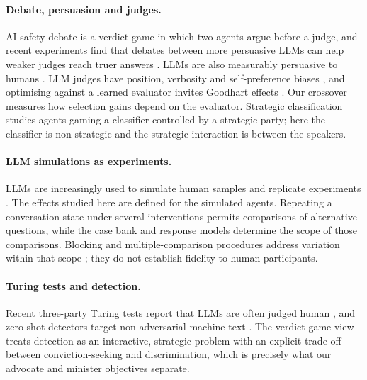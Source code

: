 \documentclass[10pt,a4paper]{article}
\theoremstyle{remark}
\begin{document}
\paragraph{Debate, persuasion and judges.}
AI-safety debate \citep{irving2018} is a verdict game in which two agents argue before a judge, and recent experiments
find that debates between more persuasive LLMs can help weaker judges reach truer answers \citep{khan2024}. LLMs are
also measurably persuasive to humans \citep{salvi2024}. LLM judges have position, verbosity and self-preference biases
\citep{zheng2023,wang2024fair,panickssery2024}, and optimising against a learned evaluator invites Goodhart effects
\citep{manheim2018,gao2023}. Our crossover measures how selection gains depend on the evaluator. Strategic classification
\citep{hardt2015,ghalme2021} studies agents gaming a classifier controlled by a strategic party; here the classifier is
non-strategic and the strategic interaction is between the speakers.

\paragraph{LLM simulations as experiments.}
LLMs are increasingly used to simulate human samples and replicate experiments
\citep{argyle2023,aher2023,horton2023,park2023,ziems2024}. The effects studied here are defined for the simulated agents. Repeating a conversation state under several
interventions permits comparisons of alternative questions, while the case bank and response models determine
the scope of those comparisons. Blocking and multiple-comparison procedures address variation within that scope
\citep{box2005,montgomery2017,kohavi2020}; they do not establish fidelity to human participants.

\paragraph{Turing tests and detection.}
Recent three-party Turing tests report that LLMs are often judged human \citep{jones2024,jones2025,rathi2024}, and
zero-shot detectors target non-adversarial machine text \citep{mitchell2023,mireshghallah2024}. The verdict-game view
treats detection as an interactive, strategic problem with an explicit trade-off between conviction-seeking and
discrimination, which is precisely what our advocate and minister objectives separate.






\appendix

\end{document}
